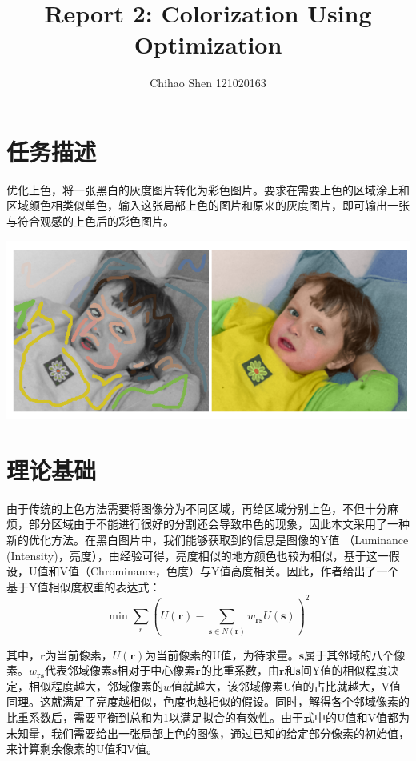 \documentclass[12pt, a4paper, oneside]{report}
\title{Report 2: Colorization Using Optimization}
\author{Chihao Shen 121020163}
\begin{document}
	
	\rmfamily
	\maketitle
	
	\songti 
	
	\section{任务描述}
	
	优化上色，将一张黑白的灰度图片转化为彩色图片。要求在需要上色的区域涂上和区域颜色相类似单色，输入这张局部上色的图片和原来的灰度图片，即可输出一张与符合观感的上色后的彩色图片。
	
	\centerline{	
		\includegraphics[scale=0.3]{task.png}
	}
	
	\section{理论基础}
	由于传统的上色方法需要将图像分为不同区域，再给区域分别上色，不但十分麻烦，部分区域由于不能进行很好的分割还会导致串色的现象，因此本文采用了一种新的优化方法。在黑白图片中，我们能够获取到的信息是图像的Y值 （Luminance (Intensity)，亮度），由经验可得，亮度相似的地方颜色也较为相似，基于这一假设，U值和V值（Chrominance，色度）与Y值高度相关。因此，作者给出了一个基于Y值相似度权重的表达式：
	$$\min\sum_r\left(U\left(\mathbf{r}\right) - \sum_{\mathbf{s}\in
	N\left(\mathbf{r}\right)}w_{\mathbf{rs}}U\left(\mathbf{s}\right)\right)^2$$
	
	其中，$\mathbf{r}$为当前像素，$U\left(\mathbf{r}\right)$为当前像素的U值，为待求量。$\mathbf{s}$属于其邻域的八个像素。$w_{\mathbf{rs}}$代表邻域像素$\mathbf{s}$相对于中心像素$\mathbf{r}$的比重系数，由$\mathbf{r}$和$\mathbf{s}$间Y值的相似程度决定，相似程度越大，邻域像素的$w$值就越大，该邻域像素U值的占比就越大，V值同理。这就满足了亮度越相似，色度也越相似的假设。同时，解得各个邻域像素的比重系数后，需要平衡到总和为1以满足拟合的有效性。由于式中的U值和V值都为未知量，我们需要给出一张局部上色的图像，通过已知的给定部分像素的初始值，来计算剩余像素的U值和V值。
	
\end{document}
